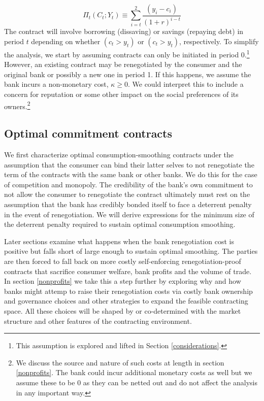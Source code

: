 \documentclass[11pt,english]{article}
\theoremstyle{plain}
\theoremstyle{definition}
\begin{document}
\begin{equation}
\Pi_{t}(C_{t};Y_{t})\equiv\sum\limits _{i=t}^{2}\frac{\left(y_{i}-c_{i}\right)}{\left(1+r\right)^{i-t}}\label{eq:profit}
\end{equation}
The contract will involve borrowing (dissaving) or savings  (repaying debt) in period \(t\) depending on whether \((c_{t}>y_t)\) or  \((c_{t}>y_t) \), respectively.
To simplify the analysis, we start by assuming contracts can only
be initiated in period 0.\footnote{This assumption is explored and lifted in Section \ref{considerations}.}
However, an existing contract may be renegotiated by the consumer
and the original bank or possibly a new one in period 1. If this happens, we assume the bank 
incurs a non-monetary cost, $\kappa\geq0$. We could interpret
this to include a concern for reputation or some other impact on the social
preferences of its owners.\footnote{We discuss the source and nature of such costs at length in section \ref{nonprofits}. The bank could incur additional monetary costs as well but we assume these to be 0 as they can be netted out and do not affect the analysis in any important way. }


\subsection{Optimal commitment contracts }

We first characterize optimal consumption-smoothing contracts under the assumption that the consumer can bind their
latter selves to not renegotiate the term of the contracts with the same bank or other
banks. We do this for the case of competition and monopoly. The credibility of the bank's own commitment to not allow the consumer to renegotiate the  contract ultimately must rest on the assumption that the bank has
credibly bonded itself to face a deterrent penalty 
in the event of renegotiation. We will derive expressions for the minimum size of the deterrent penalty required to sustain optimal consumption smoothing.

 Later sections examine what happens when the bank renegotiation cost is positive but falls short of large enough to sustain optimal smoothing.  The
parties are then forced to fall back on more costly self-enforcing 
renegotiation-proof contracts that sacrifice consumer welfare, bank profits and the volume of trade. In section \ref{nonprofits} we take this  a step further by exploring why and how banks might attemp to raise their renegotiation costs  via costly bank ownership and governance choices and other strategies to expand the feasible contracting space. All  these choices will be shaped by or co-determined with the  market structure and other features of the contracting environment.
\end{document}
